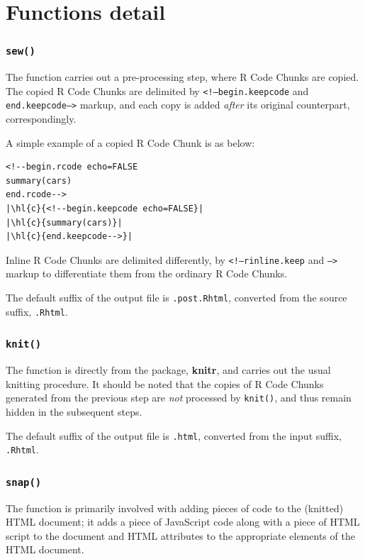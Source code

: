\documentclass[a4paper, 12pt]{report}
\begin{document}
\pagebreak
\section*{Functions detail}
\subsubsection*{\texttt{sew()}}
The function carries out a pre-processing step, where R Code Chunks are copied. The copied R Code Chunks are delimited by \texttt{<!--begin.keepcode} and \texttt{end.keepcode-->} markup, and each copy is added \emph{after} its original counterpart, correspondingly.

A simple example of a copied R Code Chunk is as below:
\begin{lstlisting}[numbers=none, frame=none, escapechar=\|]
<!--begin.rcode echo=FALSE
summary(cars)
end.rcode-->
|\hl{c}{<!--begin.keepcode echo=FALSE}|
|\hl{c}{summary(cars)}|
|\hl{c}{end.keepcode-->}|  
\end{lstlisting}

Inline R Code Chunks are delimited differently, by \texttt{<!--rinline.keep} and \texttt{-->} markup to differentiate them from the ordinary R Code Chunks.

The default suffix of the output file is \texttt{.post.Rhtml}, converted from the source suffix, \texttt{.Rhtml}.

\subsubsection*{\texttt{knit()}}
The function is directly from the package, \textbf{knitr}, and carries out the usual knitting procedure. It should be noted that the copies of R Code Chunks generated from the previous step are \emph{not} processed by \texttt{knit()}, and thus remain hidden in the subsequent steps.

The default suffix of the output file is \texttt{.html}, converted from the input suffix, \texttt{.Rhtml}.

\subsubsection*{\texttt{snap()}}
The function is primarily involved with adding pieces of code to the (knitted) HTML document; it adds a piece of JavaScript code along with a piece of HTML script to the document and HTML attributes to the appropriate elements of the HTML document.
\end{document}
